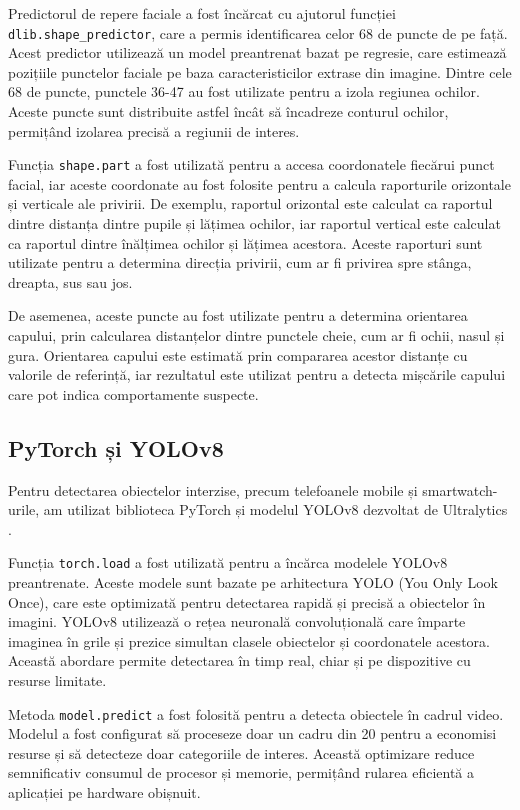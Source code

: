 \documentclass[12pt,a4paper]{article}
\begin{document}
Predictorul de repere faciale a fost încărcat cu ajutorul funcției \texttt{dlib.shape\_predictor}, care a permis identificarea celor 68 de puncte de pe față. Acest predictor utilizează un model preantrenat bazat pe regresie, care estimează pozițiile punctelor faciale pe baza caracteristicilor extrase din imagine. Dintre cele 68 de puncte, punctele 36-47 au fost utilizate pentru a izola regiunea ochilor. Aceste puncte sunt distribuite astfel încât să încadreze conturul ochilor, permițând izolarea precisă a regiunii de interes.

Funcția \texttt{shape.part} a fost utilizată pentru a accesa coordonatele fiecărui punct facial, iar aceste coordonate au fost folosite pentru a calcula raporturile orizontale și verticale ale privirii. De exemplu, raportul orizontal este calculat ca raportul dintre distanța dintre pupile și lățimea ochilor, iar raportul vertical este calculat ca raportul dintre înălțimea ochilor și lățimea acestora. Aceste raporturi sunt utilizate pentru a determina direcția privirii, cum ar fi privirea spre stânga, dreapta, sus sau jos.

De asemenea, aceste puncte au fost utilizate pentru a determina orientarea capului, prin calcularea distanțelor dintre punctele cheie, cum ar fi ochii, nasul și gura. Orientarea capului este estimată prin compararea acestor distanțe cu valorile de referință, iar rezultatul este utilizat pentru a detecta mișcările capului care pot indica comportamente suspecte.

\subsection{PyTorch și YOLOv8}
Pentru detectarea obiectelor interzise, precum telefoanele mobile și smartwatch-urile, am utilizat biblioteca PyTorch \cite{pytorch} și modelul YOLOv8 dezvoltat de Ultralytics \cite{ultralytics}. 

Funcția \texttt{torch.load} a fost utilizată pentru a încărca modelele YOLOv8 preantrenate. Aceste modele sunt bazate pe arhitectura YOLO (You Only Look Once), care este optimizată pentru detectarea rapidă și precisă a obiectelor în imagini. YOLOv8 utilizează o rețea neuronală convoluțională care împarte imaginea în grile și prezice simultan clasele obiectelor și coordonatele acestora. Această abordare permite detectarea în timp real, chiar și pe dispozitive cu resurse limitate.

Metoda \texttt{model.predict} a fost folosită pentru a detecta obiectele în cadrul video. Modelul a fost configurat să proceseze doar un cadru din 20 pentru a economisi resurse și să detecteze doar categoriile de interes. Această optimizare reduce semnificativ consumul de procesor și memorie, permițând rularea eficientă a aplicației pe hardware obișnuit.
\end{document}
